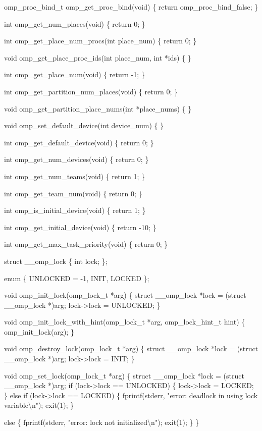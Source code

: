 {\begin{codepar}
omp\_proc\_bind\_t omp\_get\_proc\_bind(void) 
\{
    return omp\_proc\_bind\_false;
\}

int omp\_get\_num\_places(void)
\{
    return 0;
\}

int omp\_get\_place\_num\_procs(int place\_num)
\{
    return 0;
\}

void omp\_get\_place\_proc\_ids(int place\_num, int *ids)
\{
\}

int omp\_get\_place\_num(void)
\{
    return -1;
\}

int omp\_get\_partition\_num\_places(void)
\{
    return 0;
\}

void omp\_get\_partition\_place\_nums(int *place\_nums)
\{
\}

void omp\_set\_default\_device(int device\_num)
\{
\}

int omp\_get\_default\_device(void)
\{
    return 0;
\}

int omp\_get\_num\_devices(void)
\{
    return 0;
\}

int omp\_get\_num\_teams(void)
\{
    return 1;
\}

int omp\_get\_team\_num(void)
\{
    return 0;
\}

int omp\_is\_initial\_device(void)
\{
    return 1;
\}

int omp\_get\_initial\_device(void)
\{
    return -10;
\}

int omp\_get\_max\_task\_priority(void)
\{
    return 0;
\}

struct \_\_omp\_lock
\{
    int lock;
\};

enum \{ UNLOCKED = -1, INIT, LOCKED \};

void omp\_init\_lock(omp\_lock\_t *arg)
\{
    struct \_\_omp\_lock *lock = (struct \_\_omp\_lock *)arg;
    lock->lock = UNLOCKED;
\}

void omp\_init\_lock\_with\_hint(omp\_lock\_t *arg, omp\_lock\_hint\_t hint)
\{
    omp\_init\_lock(arg);
\}

void omp\_destroy\_lock(omp\_lock\_t *arg)
\{
    struct \_\_omp\_lock *lock = (struct \_\_omp\_lock *)arg;
    lock->lock = INIT;
\}

void omp\_set\_lock(omp\_lock\_t *arg)
\{
    struct \_\_omp\_lock *lock = (struct \_\_omp\_lock *)arg;
    if (lock->lock == UNLOCKED)
    \{
        lock->lock = LOCKED;
    \}
    else if (lock->lock == LOCKED)
    \{
        fprintf(stderr, "error: deadlock in using lock variable{\textbackslash}n");
        exit(1);
    \}

    else
    \{
        fprintf(stderr, "error: lock not initialized{\textbackslash}n");
        exit(1);
    \}
\}


\end{codepar}}

